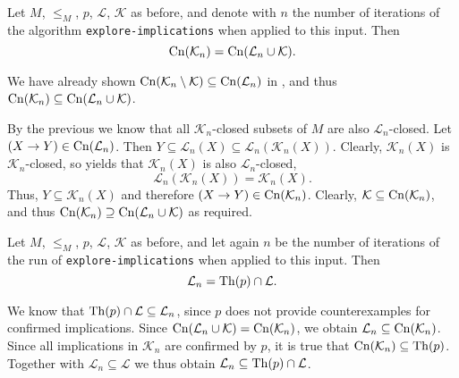 \begin{Corollary}
  \label{cor:explore-implications-closures-coincide}
  Let $M$, $\leq_M$, $p$, $\mathcal{L}$, $\mathcal{K}$ as before, and denote with $n$ the
  number of iterations of the algorithm \lstinline{explore-implications} when applied to
  this input.  Then
  \begin{equation*}
    \operatorname{Cn}(\mathcal{K}_n) = \operatorname{Cn}(\mathcal{L}_n \cup \mathcal{K}).
  \end{equation*}
\end{Corollary}
\begin{Proof}
  We have already shown $\operatorname{Cn}(\mathcal{K}_n \setminus \mathcal{K}) \subseteq
  \operatorname{Cn}(\mathcal{L}_n)$ in , and thus
  $\operatorname{Cn}(\mathcal{K}_n) \subseteq \operatorname{Cn}(\mathcal{L}_n \cup \mathcal{K})$.

  By the previous  we know that all
  $\mathcal{K}_n$-closed subsets of $M$ are also $\mathcal{L}_n$-closed.  Let $(X \to Y)
  \in \operatorname{Cn}(\mathcal{L}_n)$.  Then $Y \subseteq \mathcal{L}_n(X) \subseteq
  \mathcal{L}_n(\mathcal{K}_n(X))$.  Clearly, $\mathcal{K}_n(X)$ is
  $\mathcal{K}_n$-closed, so  yields
  that $\mathcal{K}_n(X)$ is also $\mathcal{L}_n$-closed, \ie
  \begin{equation*}
    \mathcal{L}_n(\mathcal{K}_n(X)) = \mathcal{K}_n(X).
  \end{equation*}
  Thus, $Y \subseteq \mathcal{K}_n(X)$ and therefore $(X \to Y) \in \operatorname{Cn}(\mathcal{K}_n)$.
  Clearly, $\mathcal{K} \subseteq \operatorname{Cn}(\mathcal{K}_n)$, and thus $\operatorname{Cn}(\mathcal{K}_n)
  \supseteq \operatorname{Cn}(\mathcal{L}_n \cup \mathcal{K})$ as required.
\end{Proof}

\begin{Corollary}
  \label{cor:explore-implications-L_n-exactly-those-confirmed-by-expert}
  Let $M$, $\leq_M$, $p$, $\mathcal{L}$, $\mathcal{K}$ as before, and let again $n$ be
  the number of iterations of the run of \lstinline{explore-implications} when applied to
  this input.  Then
  \begin{equation*}
    \mathcal{L}_n = \operatorname{Th}(p) \cap \mathcal{L}.
  \end{equation*}
\end{Corollary}
\begin{Proof}
  We know that $\operatorname{Th}(p) \cap \mathcal{L} \subseteq \mathcal{L}_{n}$, since $p$ does not
  provide counterexamples for confirmed implications.  Since $\operatorname{Cn}(\mathcal{L}_{n} \cup
  \mathcal{K}) = \operatorname{Cn}(\mathcal{K}_{n})$, we obtain $\mathcal{L}_{n} \subseteq
  \operatorname{Cn}(\mathcal{K}_{n})$.  Since all implications in $\mathcal{K}_{n}$ are confirmed by
  $p$, it is true that $\operatorname{Cn}(\mathcal{K}_{n}) \subseteq \operatorname{Th}(p)$.  Together with
  $\mathcal{L}_{n} \subseteq \mathcal{L}$ we thus obtain $\mathcal{L}_{n} \subseteq \operatorname{Th}(p)
  \cap \mathcal{L}$.
\end{Proof}

